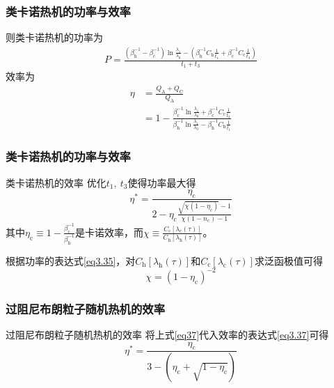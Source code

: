 \documentclass{beamer}
\begin{document}
\begin{frame}
\frametitle{类卡诺热机的功率与效率}
则类卡诺热机的功率为
\begin{equation}
    \begin{split}
        P=\frac{\left(\beta_{\mathrm{h}}^{-1}-\beta_{\mathrm{c}}^{-1}\right) \ln{\frac{\lambda_1}{\lambda_0}} - \left(\beta_{\mathrm{h}}^{-1} C_{\mathrm{h}} \frac{1}{t_1} + \beta_{\mathrm{c}}^{-1} C_{\mathrm{c}} \frac{1}{t_3}\right)}{t_1+t_3}
    \end{split}
    \label{eq3.35}
\end{equation}
效率为
\begin{equation}
    \begin{split}
        \eta &= \frac{Q_{\mathrm{A}} + Q_{\mathrm{C}}}{Q_{\mathrm{A}}}\\ 
        &=1- \frac{\beta_{\mathrm{c}}^{-1} \ln{\frac{\lambda_1}{\lambda_0}} + \beta_{\mathrm{c}}^{-1} C_{\mathrm{c}} \frac{1}{t_3}}{\beta_{\mathrm{h}}^{-1} \ln{\frac{\lambda_1}{\lambda_0}} - \beta_{\mathrm{h}}^{-1} C_{\mathrm{h}} \frac{1}{t_1}}
    \end{split}
    \label{3.20}
\end{equation}
\end{frame}

\begin{frame}
    \frametitle{类卡诺热机的功率与效率}
\begin{alertblock}{类卡诺热机的效率}
    优化$t_1,\ t_3$使得功率最大得
 \begin{equation}
    \eta^{*}=\frac{\eta_{\mathrm{c}}}{2-\eta_{\mathrm{c}} \frac{\sqrt{\chi\left(1-\eta_{\mathrm{c}}\right)}-1}{\chi\left(1-n_{\mathrm{c}}\right)-1}}
    \label{eq3.37}
\end{equation}
其中$\eta_{\mathrm{c}}\equiv 1-\frac{\beta_{\mathrm{c}}^{-1}}{\beta_{\mathrm{h}}^{-1}}$是卡诺效率，而$\chi\equiv\frac{C_{\mathrm{c}} [\lambda_{\mathrm{c}}(\tau)]}{C_{\mathrm{h}} [\lambda_{\mathrm{h}}(\tau)]}$。
\pause

根据功率的表达式\eqref{eq3.35}，对$C_{\mathrm{h}} [\lambda_{\mathrm{h}}(\tau)]$和$C_{\mathrm{c}} [\lambda_{\mathrm{c}}(\tau)]$求泛函极值可得
\begin{equation}
    \chi={(1-\eta_{\mathrm{c}})}^{-2}
    \label{eq37}
\end{equation}
\end{alertblock}
\end{frame}

\begin{frame}
\frametitle{过阻尼布朗粒子随机热机的效率}
\begin{alertblock}{过阻尼布朗粒子随机热机的效率}
将上式\eqref{eq37}代入效率的表达式\eqref{eq3.37}可得 
\begin{equation}
    \eta^{*}=\frac{\eta_{\mathrm{c}}}{3-\left(\eta_{\mathrm{c}}+\sqrt{1-\eta_{\mathrm{c}}}\right)}
\end{equation}   
\end{alertblock}
\end{frame}
\end{document}
